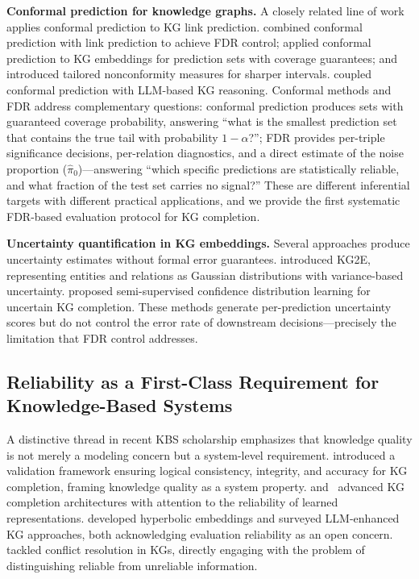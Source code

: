 \textbf{Conformal prediction for knowledge graphs.}
A closely related line of work applies conformal prediction to KG link prediction.
\cite{marandon2024conformal} combined conformal prediction with link prediction to achieve FDR control; \cite{zhu2025conformal} applied conformal prediction to KG embeddings for prediction sets with coverage guarantees; and \cite{zhu2025certainty} introduced tailored nonconformity measures for sharper intervals.
\cite{ni2025towards} coupled conformal prediction with LLM-based KG reasoning.
Conformal methods and FDR address complementary questions:
conformal prediction produces sets with guaranteed coverage probability, answering ``what is the smallest prediction set that contains the true tail with probability $1-\alpha$?'';
FDR provides per-triple significance decisions, per-relation diagnostics, and a direct estimate of the noise proportion ($\hat{\pi}_0$)---answering ``which specific predictions are statistically reliable, and what fraction of the test set carries no signal?''
These are different inferential targets with different practical applications, and we provide the first systematic FDR-based evaluation protocol for KG completion.

\textbf{Uncertainty quantification in KG embeddings.}
Several approaches produce uncertainty estimates without formal error guarantees.
\cite{he2015learning} introduced KG2E, representing entities and relations as Gaussian distributions with variance-based uncertainty.
\cite{wu2025uncertain} proposed semi-supervised confidence distribution learning for uncertain KG completion.
These methods generate per-prediction uncertainty scores but do not control the error rate of downstream decisions---precisely the limitation that FDR control addresses.

\subsection{Reliability as a First-Class Requirement for Knowledge-Based Systems}

A distinctive thread in recent KBS scholarship emphasizes that knowledge quality is not merely a modeling concern but a system-level requirement.
\cite{purohit2025vanilla} introduced a validation framework ensuring logical consistency, integrity, and accuracy for KG completion, framing knowledge quality as a system property.
\cite{shang2024learnable} and~\cite{fang2025knowledge} advanced KG completion architectures with attention to the reliability of learned representations.
\cite{lu2024deep} developed hyperbolic embeddings and \cite{le2023knowledge} surveyed LLM-enhanced KG approaches, both acknowledging evaluation reliability as an open concern.
\cite{zhang2023conflict} tackled conflict resolution in KGs, directly engaging with the problem of distinguishing reliable from unreliable information.


